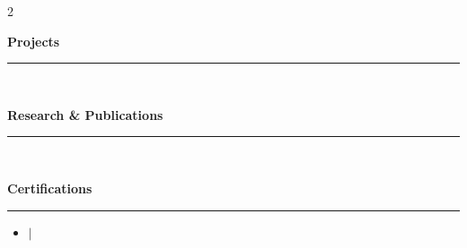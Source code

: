 \documentclass[10pt, letterpaper]{article}
\begin{document}
\begin{paracol}{2}
\begin{rightcolumn}
                    \vspace{4mm} 
            \needspace{6cm} 
            {\Large \textbf{Projects}}
            \vspace{1mm}
            {\color{lineColor}\hrule}
            \vspace{4mm}
            
                            \begin{minipage}[t]{\linewidth}
                    \noindent \textbf{} \\
                    \vspace{1mm} 
                    {\small \begin{itemize}  \end{itemize}}
                    \vspace{4mm} 
                \end{minipage}
                    
                    \vspace{4mm} 
            \needspace{6cm}
            {\Large \textbf{Research \& Publications}}
            \vspace{1mm}
            {\color{lineColor}\hrule}
            \vspace{4mm}
            
                            \begin{minipage}[t]{\linewidth}
                    \noindent \textbf{} \hfill \small  \\
                    {\small }
                    \vspace{4mm}
                \end{minipage}
                    
                    \vspace{4mm} 
            \needspace{4cm}
            {\Large \textbf{Certifications}}
            \vspace{1mm}
            {\color{lineColor}\hrule}
            \vspace{4mm}

            \begin{itemize}[leftmargin=0pt, label={}, nosep]
                                    \item \textbf{} \hspace{1mm} $|$ \hspace{1mm} \textit{} \hfill \small 
                    \vspace{2mm} 
                            \end{itemize}
        
    \end{rightcolumn}
\end{paracol}
\end{document}

